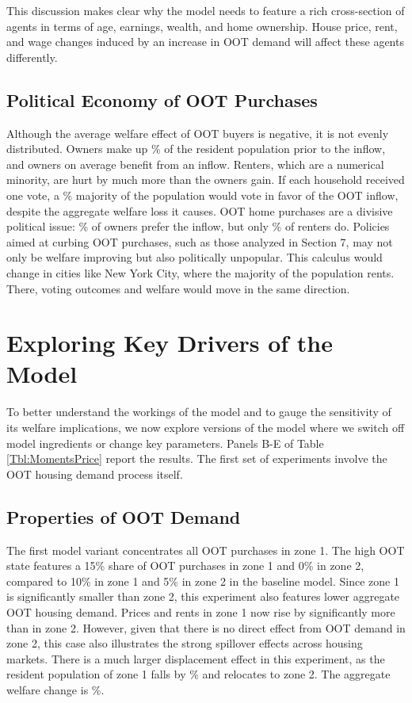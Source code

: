 \documentclass[letterpaper,12pt,dvipsnames,usenames]{article}
\theoremstyle{definition}
\begin{document}
\begin{spacing}{1.25}
{This discussion makes clear why the model needs to feature  a rich cross-section of agents in terms of age, earnings, wealth, and home ownership. House price, rent, and wage changes induced by an increase in OOT demand will affect these agents differently.


\subsection{Political Economy of OOT Purchases}

Although the average welfare effect of OOT buyers is negative, it is not evenly distributed. Owners make up {\AvgOwnRateB}\% of the resident population prior to the inflow, and owners on average benefit from an inflow. Renters, which are a numerical minority, are hurt by much more than the owners gain. If each household received one vote, a {\BaselineAvgBenefit}\% majority of the population would vote in favor of the OOT inflow, despite the aggregate welfare loss it causes. OOT home purchases are a divisive political issue: {\BaselineAvgOwnBenefit}\% of owners prefer the inflow, but only {\BaselineAvgRentBenefit}\% of renters do. Policies aimed at curbing OOT purchases, such as those analyzed in Section 7, may not only be welfare improving but also politically unpopular. This calculus would change in cities like New York City, where the majority of the population rents. There, voting outcomes and welfare would move in the same direction.


\section{Exploring Key Drivers of the Model}

To better understand the workings of the model and to gauge the sensitivity of its welfare implications, we now explore versions of the model where we switch off model ingredients or change key parameters. Panels B-E of Table \ref{Tbl:MomentsPrice} report the results. The first set of experiments involve the OOT housing demand process itself.


\subsection{Properties of OOT Demand}
The first model variant concentrates all OOT purchases in zone 1. The high OOT state features a 15\% share of OOT purchases in zone 1 and 0\% in zone 2, compared to 10\% in zone 1 and 5\% in zone 2 in the baseline model. Since zone 1 is significantly smaller than zone 2, this experiment also features lower aggregate OOT housing demand. Prices and rents in zone 1 now rise by significantly more than in zone 2. However, given that there is no direct effect from OOT demand in zone 2, this case also illustrates the strong spillover effects across housing markets. There is a much larger displacement effect in this experiment, as the resident population of zone 1 falls by  \% and relocates to zone 2. The aggregate welfare change is \%.

}
\end{spacing}
\end{document}
